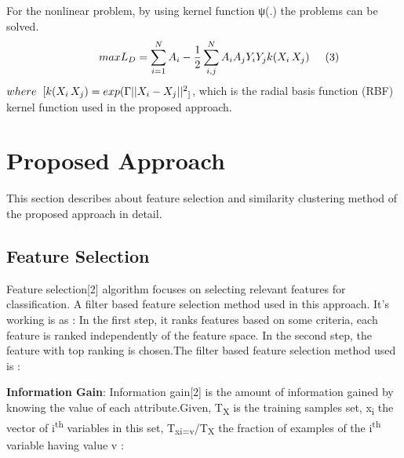 \documentclass[a4paper, 10pt, conference]{ieeeconf}      %
\begin{document}
For the nonlinear problem, by using kernel function ψ(.) the problems can be solved. 
\[\hspace{1cm}max L_{D} = \sum_{i=1}^{N} A_{i} - \frac{1}{2}\sum_{i,j}^{N} A_{i}A_{j}Y_{i}Y_{j}k(X_{i}\,X_{j}) \hspace{0.5cm}(3)\] 
$where\hspace{0.2cm}[k(X_{i}\,X_{j})= exp(\Gamma||X_{i}-X_{j}||\textsuperscript{2}_]$, which is the radial basis function (RBF) kernel function used in the proposed approach.


\section{Proposed Approach}
This section describes about feature selection and similarity clustering method of the proposed approach in detail. 
\subsection{Feature Selection}
\par 
Feature selection[2] algorithm focuses on selecting relevant features for classification. A filter based feature selection method used in this approach. It's working is as : In the first step, it ranks features based on some criteria, each feature is ranked independently of the feature space. In the second step, the feature with top ranking is chosen.The filter based feature selection method used is :
\par
\textbf{Information Gain}: Information gain[2] is the amount of information gained by knowing the value of each attribute.Given, T\textsubscript{X} is the training samples set, x\textsubscript{i} the vector of i\textsuperscript{th} variables in this set, T\textsubscript{xi=v}/T\textsubscript{X} the fraction of examples of the i\textsuperscript{th} variable having value v : 
\newline
\end{document}
